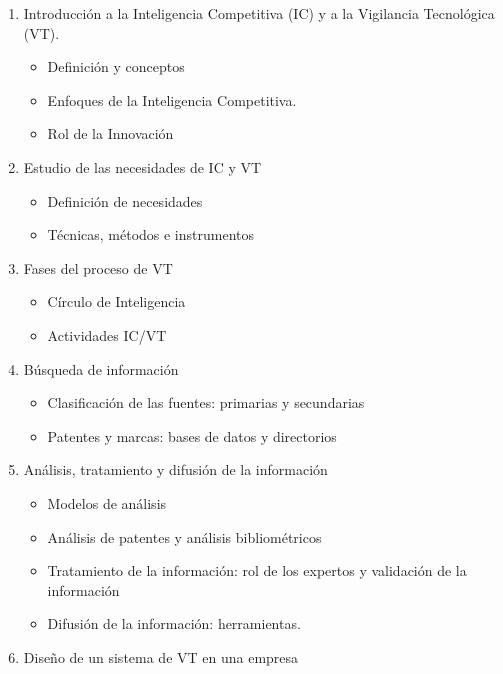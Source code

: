 \documentclass[11pt,letterpaper]{article}
\begin{document}
\begin{enumerate}
  \item Introducción a la Inteligencia Competitiva (IC) y a la Vigilancia Tecnológica (VT).
    \begin{itemize}
      \item Definición y conceptos
      \item Enfoques de la Inteligencia Competitiva.
      \item Rol de la Innovación
    \end{itemize}

  \item Estudio de las necesidades de IC y VT
    \begin{itemize}
      \item  Definición de necesidades
      \item Técnicas, métodos e instrumentos
    \end{itemize}

  \item Fases del proceso de VT
    \begin{itemize}
      \item Círculo de Inteligencia
      \item Actividades IC/VT
    \end{itemize}

  \item Búsqueda de información
    \begin{itemize}
      \item Clasificación de las fuentes: primarias y secundarias
      \item Patentes y marcas: bases de datos y directorios
    \end{itemize}

  \item Análisis, tratamiento y difusión de la información
    \begin{itemize}
      \item Modelos de análisis
      \item Análisis de patentes y análisis bibliométricos
      \item Tratamiento de la información: rol de los expertos y validación de la información
      \item Difusión de la información: herramientas.
    \end{itemize}

  \item Diseño de un sistema de VT en una empresa
\end{enumerate}
\end{document}
